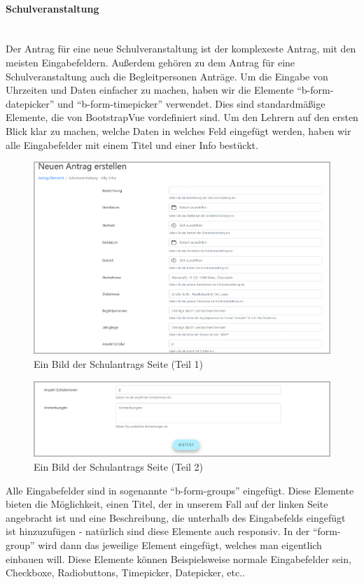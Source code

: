\paragraph{Schulveranstaltung}
~\\
Der Antrag für eine neue Schulveranstaltung ist der komplexeste Antrag, mit den meisten Eingabefeldern. Außerdem gehören zu dem Antrag für eine Schulveranstaltung auch die Begleitpersonen Anträge. Um die Eingabe von Uhrzeiten und Daten einfacher zu machen, haben wir die Elemente \enquote{b-form-datepicker} und \enquote{b-form-timepicker} verwendet. Dies sind standardmäßige Elemente, die von BootstrapVue vordefiniert sind. Um den Lehrern auf den ersten Blick klar zu machen, welche Daten in welches Feld eingefügt werden, haben wir alle Eingabefelder mit einem Titel und einer Info bestückt.
\begin{figure}[H]
	\centering
	\includegraphics[width=1\linewidth]{images/website/schul_1}
	\caption[Neuer Schulantrag]{Ein Bild der Schulantrags Seite (Teil 1)}
	\label{fig:schulantrag1}
\end{figure}
\begin{figure}[H]
	\centering
	\includegraphics[width=1\linewidth]{images/website/schul_2}
	\caption[Neuer Schulantrag]{Ein Bild der Schulantrags Seite (Teil 2)}
	\label{fig:schulantrag2}
\end{figure}
Alle Eingabefelder sind in sogenannte \enquote{b-form-groups} eingefügt. Diese Elemente bieten die Möglichkeit, einen Titel, der in unserem Fall auf der linken Seite angebracht ist und eine Beschreibung, die unterhalb des Eingabefelds eingefügt ist hinzuzufügen - natürlich sind diese Elemente auch responsiv. In der \enquote{form-group} wird dann das jeweilige Element eingefügt, welches man eigentlich einbauen will. Diese Elemente können Beispielsweise normale Eingabefelder sein, Checkboxe, Radiobuttons, Timepicker, Datepicker, etc.. 
